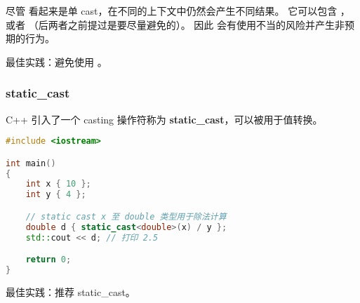 \documentclass[../../LearnCpp.tex]{subfiles}
\begin{document}
尽管  看起来是单 cast，在不同的上下文中仍然会产生不同结果。
它可以包含  ， 或者 （后两者之前提过是要尽量避免的）。
因此  会有使用不当的风险并产生非预期的行为。

最佳实践：避免使用  。

\subsubsection*{static\_cast}

C++ 引入了一个 casting 操作符称为 \textbf{static\_cast}，可以被用于值转换。

\begin{lstlisting}[language=C++]
#include <iostream>

int main()
{
    int x { 10 };
    int y { 4 };

    // static cast x 至 double 类型用于除法计算
    double d { static_cast<double>(x) / y };
    std::cout << d; // 打印 2.5

    return 0;
}
\end{lstlisting}

最佳实践：推荐 static\_cast。
\end{document}
